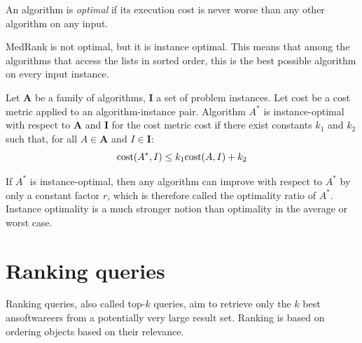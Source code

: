 \documentclass[12pt, a4paper]{report}
\newtheorem[style=M,bodystyle=\normalfont]{theorem}{Theorem}
\newtheorem[style=M,bodystyle=\normalfont]{corollary}{Corollary}
\newtheorem[style=M,bodystyle=\normalfont]{lemma}{Lemma}
\newtheorem[style=M,bodystyle=\normalfont]{definition}{Definition}
\begin{document}
    \begin{definition}
        An algorithm is \emph{optimal} if its execution cost is never worse than any other algorithm on any input.
    \end{definition}
    MedRank is not optimal, but it is instance optimal. This means that among the algorithms that access the lists in sorted order, this is the best possible algorithm on every 
    input instance. 
    \begin{definition}
        Let $\boldsymbol{A}$ be a family of algorithms, $\boldsymbol{I}$ a set of problem instances. Let cost be a cost metric applied to an algorithm-instance pair. Algorithm 
        $A^{*}$ is instance-optimal with respect to $\boldsymbol{A}$ and $\boldsymbol{I}$ for the cost metric cost if there exist constants $k_1$ and $k_2$ such that, for all 
        $A \in \boldsymbol{A}$ and $I \in \boldsymbol{I}$: 
        \[\textnormal{cost}(A^{*}, I) \leq k_1 \textnormal{cost}(A, I) + k_2\]
    \end{definition}
    If $A^{*}$ is instance-optimal, then any algorithm can improve with respect to $A^{*}$ by only a constant factor $r$, which is therefore called the optimality ratio of $A^{*}$. 
    Instance optimality is a much stronger notion than optimality in the average or worst case. 

    \section{Ranking queries}
    Ranking queries, also called top-$k$ queries, aim to retrieve only the $k$ best ansoftwareers from a potentially very large result set. Ranking is based on ordering objects based on their relevance.
\end{document}
